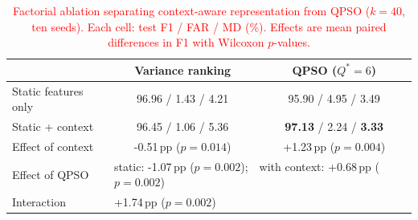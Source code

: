 \begin{table}[!t]
\centering
\scriptsize
\caption{\textcolor{red}{Factorial ablation separating context-aware representation from QPSO
($k{=}40$, ten seeds). Each cell: test F1 / FAR / MD (\%). Effects are mean paired differences in F1 with
Wilcoxon $p$-values.}}
\label{tab:centralized_compare}
\color{red}
\setlength{\tabcolsep}{4pt}
\begin{tabular}{lcc}
\hline\toprule
 & \textbf{Variance ranking} & \textbf{QPSO ($Q^{*}{=}6$)} \\
\hline\toprule
Static features only & 96.96 / 1.43 / 4.21 & 95.90 / 4.95 / 3.49 \\
Static + context & 96.45 / 1.06 / 5.36 & \textbf{97.13} / 2.24 / \textbf{3.33} \\
\midrule
Effect of context & -0.51\,pp ($p{=}0.014$) & +1.23\,pp ($p{=}0.004$) \\
Effect of QPSO & \multicolumn{2}{l}{static: -1.07\,pp ($p{=}0.002$);\ \ with context: +0.68\,pp ($p{=}0.002$)} \\
Interaction & \multicolumn{2}{l}{+1.74\,pp ($p{=}0.002$)} \\
\hline\toprule
\end{tabular}
\end{table}
